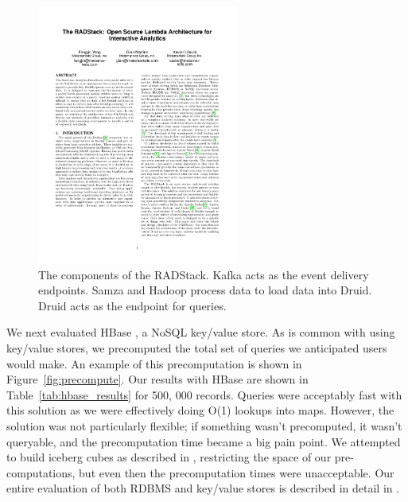 \documentclass{vldb}
\begin{document}
\begin{figure}
\centering
\includegraphics[width = 2.6in]{radstack}
\caption{
The components of the RADStack. Kafka acts as the event delivery
endpoints. Samza and Hadoop process data to load data into Druid. Druid acts as
the endpoint for queries.
}
\label{fig:radstack}
\end{figure}

We next evaluated HBase \cite{george2011hbase}, a NoSQL key/value store. As is
common with using key/value stores, we precomputed the total set of queries we
anticipated users would make. An example of this precomputation is shown in
Figure~\ref{fig:precompute}. Our results with HBase are shown in
Table~\ref{tab:hbase_results} for 500, 000 records. 
Queries were acceptably fast with this solution as we were effectively doing
O(1) lookups into maps.  However, the solution was not particularly flexible;
if something wasn't precomputed, it wasn’t queryable, and the precomputation
time became a big pain point. We attempted to build iceberg cubes as described
in \cite{beyer1999bottom}, restricting the space of our pre-computations, but
even then the precomputation times were unacceptable.  Our entire evaluation of
both RDBMS and key/value stores is described in detail in
\cite{tschetter2011druid}.
\end{document}
